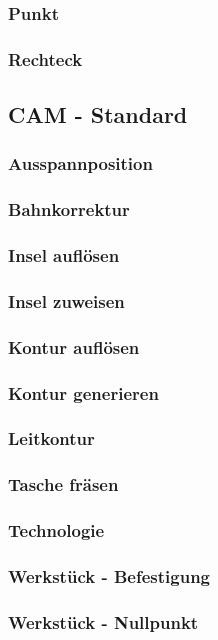 \documentclass[a4paper]{book}
\begin{document}
			\subsubsection{Punkt} 
			\subsubsection{Rechteck} 
		\subsection{CAM - Standard}
			\subsubsection{Ausspannposition} 
			\subsubsection{Bahnkorrektur} 
			\subsubsection{Insel auflösen}
			\subsubsection{Insel zuweisen} 
			\subsubsection{Kontur auflösen}
			\subsubsection{Kontur generieren}
			\subsubsection{Leitkontur} 
			\subsubsection{Tasche fräsen} 
			\subsubsection{Technologie} 
			\subsubsection{Werkstück - Befestigung} 
			\subsubsection{Werkstück - Nullpunkt} 
\end{document}
